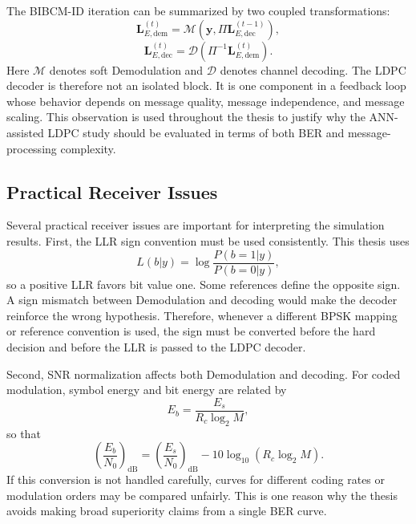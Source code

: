 The BIBCM-ID iteration can be summarized by two coupled transformations:
\begin{equation}
  \mathbf{L}_{E,\mathrm{dem}}^{(t)}
  =
  \mathcal{M}\left(\mathbf{y},\Pi\mathbf{L}_{E,\mathrm{dec}}^{(t-1)}\right),
\end{equation}
\begin{equation}
  \mathbf{L}_{E,\mathrm{dec}}^{(t)}
  =
  \mathcal{D}\left(\Pi^{-1}\mathbf{L}_{E,\mathrm{dem}}^{(t)}\right).
\end{equation}
Here $\mathcal{M}$ denotes soft Demodulation and $\mathcal{D}$ denotes channel decoding. The LDPC decoder is therefore not an isolated block. It is one component in a feedback loop whose behavior depends on message quality, message independence, and message scaling. This observation is used throughout the thesis to justify why the ANN-assisted LDPC study should be evaluated in terms of both BER and message-processing complexity.

\subsection{Practical Receiver Issues}
Several practical receiver issues are important for interpreting the simulation results. First, the LLR sign convention must be used consistently. This thesis uses
\begin{equation}
  L(b|y)=\log\frac{P(b=1|y)}{P(b=0|y)},
\end{equation}
so a positive LLR favors bit value one. Some references define the opposite sign. A sign mismatch between Demodulation and decoding would make the decoder reinforce the wrong hypothesis. Therefore, whenever a different BPSK mapping or reference convention is used, the sign must be converted before the hard decision and before the LLR is passed to the LDPC decoder.

Second, SNR normalization affects both Demodulation and decoding. For coded modulation, symbol energy and bit energy are related by
\begin{equation}
  E_b=\frac{E_s}{R_c\log_2 M},
\end{equation}
so that
\begin{equation}
  \left(\frac{E_b}{N_0}\right)_{\mathrm{dB}}
  =
  \left(\frac{E_s}{N_0}\right)_{\mathrm{dB}}
  -
  10\log_{10}(R_c\log_2 M).
\end{equation}
If this conversion is not handled carefully, curves for different coding rates or modulation orders may be compared unfairly. This is one reason why the thesis avoids making broad superiority claims from a single BER curve.

